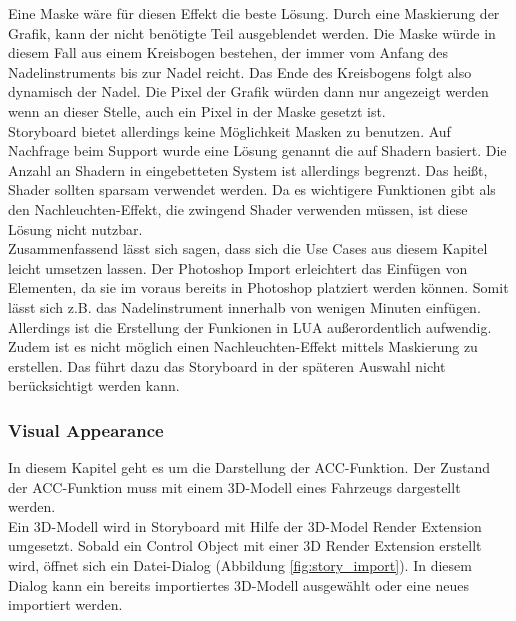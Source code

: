 Eine Maske wäre für diesen Effekt die beste Lösung. Durch eine Maskierung der Grafik, kann der nicht benötigte Teil ausgeblendet werden. Die Maske würde in diesem Fall aus einem Kreisbogen bestehen, der immer vom Anfang des Nadelinstruments bis zur Nadel reicht. Das Ende des Kreisbogens folgt also dynamisch der Nadel. Die Pixel der Grafik würden dann nur angezeigt werden wenn an dieser Stelle, auch ein Pixel in der Maske gesetzt ist.\\

Storyboard bietet allerdings keine Möglichkeit Masken zu benutzen. Auf Nachfrage beim Support wurde eine Lösung genannt die auf Shadern basiert. Die Anzahl an Shadern in eingebetteten System ist allerdings begrenzt. Das heißt, Shader sollten sparsam verwendet werden. Da es wichtigere Funktionen gibt als den Nachleuchten-Effekt, die zwingend Shader verwenden müssen, ist diese Lösung nicht nutzbar.\\

Zusammenfassend lässt sich sagen, dass sich die Use Cases aus diesem Kapitel leicht umsetzen lassen. Der Photoshop Import erleichtert das Einfügen von Elementen, da sie im voraus bereits in Photoshop platziert werden können. Somit lässt sich z.B. das Nadelinstrument innerhalb von wenigen Minuten einfügen. Allerdings ist die Erstellung der Funkionen in LUA außerordentlich aufwendig. Zudem ist es nicht möglich einen Nachleuchten-Effekt mittels Maskierung zu erstellen. Das führt dazu das Storyboard in der späteren Auswahl nicht berücksichtigt werden kann.\\

\subsubsection{Visual Appearance}
In diesem Kapitel geht es um die Darstellung der \ac{ACC}-Funktion. Der Zustand der \ac{ACC}-Funktion muss mit einem 3D-Modell eines Fahrzeugs dargestellt werden.\\

Ein 3D-Modell wird in Storyboard mit Hilfe der 3D-Model Render Extension umgesetzt. Sobald ein Control Object mit einer 3D Render Extension erstellt wird, öffnet sich ein Datei-Dialog (Abbildung \ref{fig:story_import}). In diesem Dialog kann ein bereits importiertes 3D-Modell ausgewählt oder eine neues importiert werden.\\

